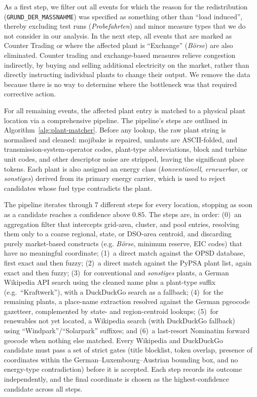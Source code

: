 As a first step, we filter out all events for which the reason for the
redistribution (\texttt{GRUND\_DER\_MASSNAHME}) was specified as something other
than ``load induced'', thereby excluding test runs (\emph{Probefahrten}) and
minor measure types that we do not consider in our analysis. In the next step,
all events that are marked as Counter Trading or where the affected plant is
``Exchange'' (\emph{B\"orse}) are also eliminated. Counter trading and
exchange-based measures relieve congestion indirectly, by buying and selling
additional electricity on the market, rather than directly instructing
individual plants to change their output. We remove the data because there is no
way to determine where the bottleneck was that required corrective action.

For all remaining events, the affected plant entry is matched to a physical
plant location via a comprehensive pipeline. The pipeline's steps are outlined
in Algorithm~\ref{alg:plant-matcher}. Before any lookup, the raw plant string is
normalised and cleaned: mojibake is repaired, umlauts are ASCII-folded, and
transmission-system-operator codes, plant-type abbreviations, block and turbine
unit codes, and other descriptor noise are stripped, leaving the significant
place tokens. Each plant is also assigned an energy class
(\emph{konventionell}, \emph{erneuerbar}, or \emph{sonstiges}) derived from its
primary energy carrier, which is used to reject candidates whose fuel type
contradicts the plant.

The pipeline iterates through 7 different steps for every location, stopping as
soon as a candidate reaches a confidence above $0.85$. The steps are, in order:
(0)~an aggregation filter that intercepts grid-area, cluster, and pool entries,
resolving them only to a coarse regional, state, or DSO-area centroid, and
discarding purely market-based constructs (e.g. \emph{B\"orse}, minimum reserve,
EIC codes) that have no meaningful coordinate; (1)~a direct match against the
OPSD database, first exact and then fuzzy; (2)~a direct match against the PyPSA
plant list, again exact and then fuzzy; (3)~for conventional and
\emph{sonstiges} plants, a German Wikipedia API search using the cleaned name
plus a plant-type suffix (e.g.\ ``Kraftwerk''), with a DuckDuckGo search as a
fallback; (4)~for the remaining plants, a place-name extraction resolved against
the German pgeocode gazetteer, complemented by state- and region-centroid
lookups; (5)~for renewables not yet located, a Wikipedia search (with
DuckDuckGo fallback) using ``Windpark''/``Solarpark'' suffixes; and (6)~a
last-resort Nominatim forward geocode when nothing else matched. Every Wikipedia
and DuckDuckGo candidate must pass a set of strict gates (title blocklist, token
overlap, presence of coordinates within the German--Luxembourg--Austrian bounding
box, and no energy-type contradiction) before it is accepted. Each step records
its outcome independently, and the final coordinate is chosen as the
highest-confidence candidate across all steps.

